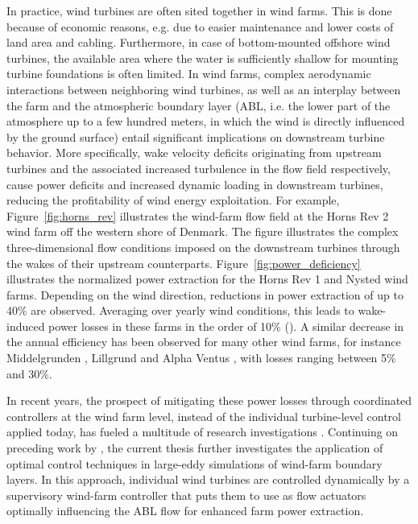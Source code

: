 In practice, wind turbines are often sited together in wind farms. This is done because of economic reasons, e.g. due to easier maintenance and lower costs of land area and cabling. Furthermore, in case of bottom-mounted offshore wind turbines, the available area where the water is sufficiently shallow for mounting turbine foundations is often limited. In wind farms, complex aerodynamic interactions between neighboring wind turbines, as well as an interplay between the farm and the atmospheric boundary layer (ABL, i.e. the lower part of the atmosphere up to a few hundred meters, in which the wind is directly influenced by the ground surface) entail significant implications on downstream turbine behavior. More specifically, wake velocity deficits originating from upstream turbines and the associated increased turbulence in the flow field respectively, cause power deficits and increased dynamic loading in downstream turbines, reducing the profitability of wind energy exploitation. For example, Figure~\ref{fig:horns_rev} illustrates the wind-farm flow field at the Horns Rev 2 wind farm off the western shore of Denmark. The figure illustrates the complex three-dimensional flow conditions imposed on the downstream turbines through the wakes of their upstream counterparts. Figure~\ref{fig:power_deficiency} illustrates the normalized power extraction for the Horns Rev 1 and Nysted wind farms. Depending on the wind direction, reductions in power extraction of up to 40\% are observed. Averaging over yearly wind conditions, this leads to wake-induced power losses in these farms in the order of 10\% (\citealt{jensen2005wake, barthelmie2010evaluation,barthelmie2010quantifying}). A similar decrease in the annual efficiency has been observed for many other wind farms, for instance Middelgrunden \citep{barthelmie2007modeling2}, Lillgrund \citep{dahlberg2009assessment} and Alpha Ventus \citep{westerhelweg2014wake}, with losses ranging between 5\% and 30\%.

In recent years, the prospect of mitigating these power losses through coordinated controllers at the wind farm level, instead of the individual turbine-level control applied today, has fueled a multitude of research investigations \citep{knudsen2015survey,boersma2017tutorial}. Continuing on preceding work by \cite{goit2015optimal}, the current thesis further investigates the application of optimal control techniques in large-eddy simulations of wind-farm boundary layers. In this approach, individual wind turbines are controlled dynamically by a supervisory wind-farm controller that puts them to use as flow actuators optimally influencing the ABL flow for enhanced farm power extraction. 

